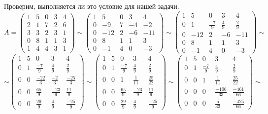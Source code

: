 \documentclass{article}
\begin{document}
\noindent Проверим, выполняется ли это условие для нашей задачи.
\begin{equation*}
A =
\begin{pmatrix}
1 & 5 & 0 & 3 & 4\\
2 & 1 & 7 & 2 & 6\\
3 & 3 & 2 & 3 & 1\\
0 & 8 & 1 & 1 & 3\\
1 & 4 & 4 & 3 & 1
\end{pmatrix}
\sim
\begin{pmatrix}
1 & 5 & 0 & 3 & 4\\
0 & -9 & 7 & -4 & -2\\
0 & -12 & 2 & -6 & -11\\
0 & 8 & 1 & 1 & 3\\
0 & -1 & 4 & 0 & -3
\end{pmatrix}
\sim
\begin{pmatrix}
1 & 5 & 0 & 3 & 4\\
0 & 1 & \frac{-7}{9} & \frac{4}{9} & \frac{2}{9}\\
0 & -12 & 2 & -6 & -11\\
0 & 8 & 1 & 1 & 3\\
0 & -1 & 4 & 0 & -3
\end{pmatrix}
\sim
\end{equation*}
\begin{equation*}
\sim
  \begin{pmatrix}
1 & 5 & 0 & 3 & 4\\
0 & 1 & \frac{-7}{9} & \frac{4}{9} & \frac{2}{9}\\
0 & 0 & \frac{-22}{3} & \frac{-2}{3} & \frac{-25}{3}\\
0 & 0 & \frac{65}{9} & \frac{-23}{9} & \frac{11}{9}\\
0 & 0 & \frac{29}{9} & \frac{4}{9} & \frac{-25}{9}
\end{pmatrix} 
\sim
 \begin{pmatrix}
1 & 5 & 0 & 3 & 4\\
0 & 1 & \frac{-7}{9} & \frac{4}{9} & \frac{2}{9}\\
0 & 0 & 1 & \frac{1}{11} & \frac{25}{22}\\
0 & 0 & \frac{65}{9} & \frac{-23}{9} & \frac{11}{9}\\
0 & 0 & \frac{29}{9} & \frac{4}{9} & \frac{-25}{9}
\end{pmatrix} 
\sim
 \begin{pmatrix}
1 & 5 & 0 & 3 & 4\\
0 & 1 & \frac{-7}{9} & \frac{4}{9} & \frac{2}{9}\\
0 & 0 & 1 & \frac{1}{11} & \frac{25}{22}\\
0 & 0 & 0 & \frac{-106}{33} & \frac{-461}{66}\\
0 & 0 & 0 & \frac{5}{33} & \frac{-425}{66}
\end{pmatrix} 
\sim
\end{equation*}
\end{document}
